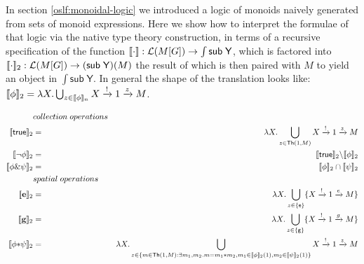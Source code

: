 In section \ref{oslf:monoidal-logic} we introduced a logic of monoids
naively generated from sets of monoid expressions. Here we show how to
interpret the formulae of that logic via the native type theory
construction, in terms of a recursive specification of the function $[\![ \cdot ]\!] : \mathcal{L}(M[G]) \to \int \mathsf{sub} \; \mathsf{Y}$, which is factored into $[\![ \cdot ]\!]_{2} : \mathcal{L}(M[G]) \to (\mathsf{sub} \; \mathsf{Y})(M)$ the result of which is then paired with $M$ to yield an object in $\int \mathsf{sub} \; \mathsf{Y}$. In general the shape of the translation looks like: $[\![ \mathsf{\phi} ]\!]_2  =  \lambda X.\bigcup_{z \in [\![ \mathsf{\phi} ]\!]_{n}} X \xrightarrow{!} 1 \xrightarrow{z} M$.

\begin{eqnarray*}
  & collection \; operations & \\
  \meaningof{\mathsf{true}}_{2} & = & \lambda X.\bigcup_{z \in \mathsf{Th}(1,M)} X \xrightarrow{!} 1 \xrightarrow{z} M \\
  \meaningof{\neg \phi}_{2} & = & \meaningof{\mathsf{true}}_{2} \backslash \meaningof{\phi}_{2} \\
  \meaningof{\phi \& \psi}_{2} & = & \meaningof{\phi}_{2} \cap \meaningof{\psi}_{2} \\
  & spatial \; operations & \\
  \meaningof{\mathbf{e}}_{2} & = & \lambda X.\bigcup_{z \in \{\mathsf{e}\}} \{ X \xrightarrow{!} 1 \xrightarrow{e} M \} \\
  \meaningof{\mathbf{g}}_{2} & = & \lambda X.\bigcup_{z \in \{\mathsf{g}\}} \{ X \xrightarrow{!} 1 \xrightarrow{g} M \} \\
  \meaningof{\phi \mathbf{*} \psi}_{2} & = & \lambda X.\bigcup_{ z \in \{ m \in \mathsf{Th}(1,M) : \exists m_{1}, m_{2}.m = m_{1} \mathsf{*} m_{2}, m_{1} \in \meaningof{\phi}_{2}(1), m_{2} \in \meaningof{\psi}_{2}(1) \}} X \xrightarrow{!} 1 \xrightarrow{z} M
\end{eqnarray*}


